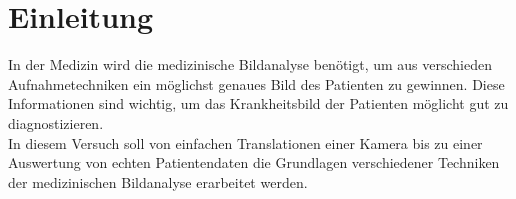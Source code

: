 \section{Einleitung}
In der Medizin wird die medizinische Bildanalyse benötigt, um aus verschieden
Aufnahmetechniken ein möglichst genaues Bild des Patienten zu gewinnen. Diese
Informationen sind wichtig, um das Krankheitsbild der Patienten möglicht gut
zu diagnostizieren.\\
In diesem Versuch soll von einfachen Translationen einer Kamera bis zu einer
Auswertung von echten Patientendaten die Grundlagen verschiedener Techniken
der medizinischen Bildanalyse erarbeitet werden.
